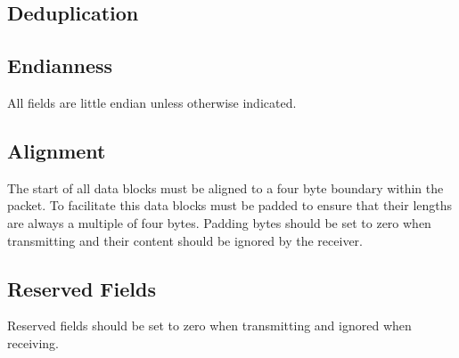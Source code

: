 \subsection {Deduplication}
\label{subsec:other-considerations_deduplication}

\subsection{Endianness}

All fields are little endian unless otherwise indicated.

\subsection{Alignment}

The start of all data blocks must be aligned to a four byte boundary within the packet. To facilitate this data blocks
must be padded to ensure that their lengths are always a multiple of four bytes. Padding bytes should be set to zero
when transmitting and their content should be ignored by the receiver.

\subsection{Reserved Fields}

Reserved fields should be set to zero when transmitting and ignored when receiving.
